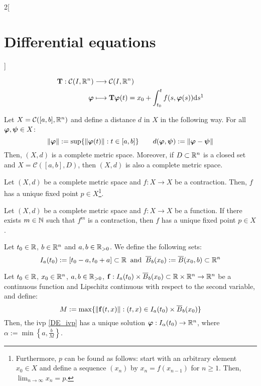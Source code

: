 \documentclass[../../../main.tex]{subfiles}
\begin{document}
\begin{multicols}{2}[\section{Differential equations}]
\begin{definition}
\begin{align*}
      \vectorfunction{T}:\mathcal{C}(I,\RR^n) & \longrightarrow\mathcal{C}(I,\RR^n)                                                                                          \\
      \vectorfunction{\varphi}                & \longmapsto \vectorfunction{T}\vectorfunction{\varphi}(t)=x_0+\int_{t_0}^tf(s,\vectorfunction{\varphi}(s))\dd s\footnotemark
    \end{align*}
  \end{definition}
  \begin{prop}
    Let $X=\mathcal{C}([a,b],\mathbb{R}^n)$ and define a distance $d$ in $X$ in the following way. For all $\boldsymbol{\mathrm{\varphi}},\boldsymbol{\mathrm{\psi}}\in X$: $$\|\boldsymbol{\mathrm{\varphi}}\|:=\sup\{\|\boldsymbol{\mathrm{\varphi}}(t)\|:t\in[a,b]\}\qquad d(\boldsymbol{\mathrm{\varphi}},\boldsymbol{\mathrm{\psi}}):=\|\boldsymbol{\mathrm{\varphi}}-\boldsymbol{\mathrm{\psi}}\|$$ Then, $(X,d)$ is a complete metric space. Moreover, if $D\subset\mathbb{R}^n$ is a closed set and $X=\mathcal{C}([a,b],D)$, then $(X,d)$ is also a complete metric space.
  \end{prop}
  \begin{theorem}
    Let $(X,d)$ be a complete metric space and $f:X\rightarrow X$ be a contraction. Then, $f$ has a unique fixed point $p\in X$\footnote{Furthermore, $p$ can be found as follows: start with an arbitrary element$x_0\in X$ and define a sequence $(x_n)$ by $x_n=f(x_{n-1})$ for $n\geq 1$. Then, $\displaystyle\lim_{n\to\infty} x_n=p$.}.
  \end{theorem}
  \begin{corollary}
    Let $(X,d)$ be a complete metric space and $f:X\rightarrow X$ be a function. If there exists $m\in\mathbb{N}$ such that $f^m$ is a contraction, then $f$ has a unique fixed point $p\in X$.
  \end{corollary}
  \begin{definition}
    Let $t_0\in\mathbb{R}$, $b\in\mathbb{R}^n$ and $a,b\in\mathbb{R}_{>0}$. We define the following sets: $$I_a(t_0):=[t_0-a,t_0+a]\subset\mathbb{R}\;\;\text{and}\;\;\overline{B}_{b}(x_0):=\overline{B}(x_0,b)\subset\mathbb{R}^n$$
  \end{definition}
  \begin{theorem}\label{DE_picard}
    Let $t_0\in\mathbb{R}$, $x_0\in\mathbb{R}^n$, $a,b\in\mathbb{R}_{>0}$, $\boldsymbol{\mathrm{f}}:I_a(t_0)\times\overline{B}_{b}(x_0)\subset\mathbb{R}\times\mathbb{R}^n\rightarrow\mathbb{R}^n$ be a continuous function and Lipschitz continuous with respect to the second variable, and define: $$M:=\max\{\|\boldsymbol{\mathrm{f}}(t,x)\|:(t,x)\in I_a(t_0)\times\overline{B}_{b}(x_0)\}$$ Then, the ivp \eqref{DE_ivp} has a unique solution $\boldsymbol{\mathrm{\varphi}}:I_\alpha(t_0)\rightarrow\mathbb{R}^n$, where $\alpha:=\min\left\{a,\frac{b}{M}\right\}$.

\end{theorem}
\end{multicols}
\end{document}
